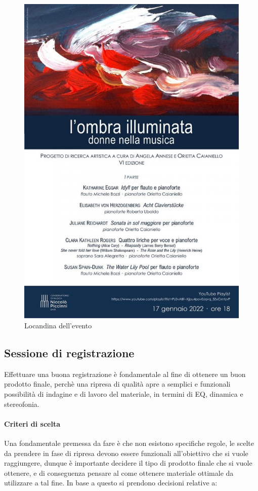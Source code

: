 	\begin{figure}[h]
		\begin{center}
			\includegraphics[width = .50\textwidth]{img/image1.jpeg}
			\caption {Locandina dell'evento}
		\end{center}
	\end{figure}
	
	\subsection{Sessione di registrazione}
	Effettuare una buona registrazione è fondamentale al fine di ottenere un buon prodotto finale, perchè una ripresa di qualità apre a semplici e funzionali possibilità di indagine e di lavoro del materiale, in termini di EQ, dinamica e stereofonia.
	
	\paragraph{Criteri di scelta}
	Una fondamentale premessa da fare è che non esistono specifiche regole, le scelte da prendere in fase di ripresa devono essere funzionali all'obiettivo che si vuole raggiungere, dunque è importante decidere il tipo di prodotto finale che si vuole ottenere, e di conseguenza pensare al come ottenere materiale ottimale da utilizzare a tal fine. In base a questo si prendono decisioni relative a:
	
